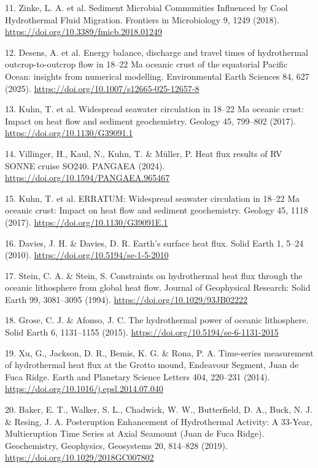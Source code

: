 \documentclass[11pt,a4paper]{article}
\begin{document}
{\small 11. Zinke, L. A. et al. Sediment Microbial Communities Influenced by Cool Hydrothermal Fluid Migration. Frontiers in Microbiology 9, 1249 (2018). \url{https://doi.org/10.3389/fmicb.2018.01249}\par}
{\small 12. Desens, A. et al. Energy balance, discharge and travel times of hydrothermal outcrop-to-outcrop flow in 18--22 Ma oceanic crust of the equatorial Pacific Ocean: insights from numerical modelling. Environmental Earth Sciences 84, 627 (2025). \url{https://doi.org/10.1007/s12665-025-12657-8}\par}
{\small 13. Kuhn, T. et al. Widespread seawater circulation in 18--22 Ma oceanic crust: Impact on heat flow and sediment geochemistry. Geology 45, 799--802 (2017). \url{https://doi.org/10.1130/G39091.1}\par}
{\small 14. Villinger, H., Kaul, N., Kuhn, T. \& Müller, P. Heat flux results of RV SONNE cruise SO240. PANGAEA (2024). \url{https://doi.org/10.1594/PANGAEA.965467}\par}
{\small 15. Kuhn, T. et al. ERRATUM: Widespread seawater circulation in 18--22 Ma oceanic crust: Impact on heat flow and sediment geochemistry. Geology 45, 1118 (2017). \url{https://doi.org/10.1130/G39091E.1}\par}
{\small 16. Davies, J. H. \& Davies, D. R. Earth's surface heat flux. Solid Earth 1, 5--24 (2010). \url{https://doi.org/10.5194/se-1-5-2010}\par}
{\small 17. Stein, C. A. \& Stein, S. Constraints on hydrothermal heat flux through the oceanic lithosphere from global heat flow. Journal of Geophysical Research: Solid Earth 99, 3081--3095 (1994). \url{https://doi.org/10.1029/93JB02222}\par}
{\small 18. Grose, C. J. \& Afonso, J. C. The hydrothermal power of oceanic lithosphere. Solid Earth 6, 1131--1155 (2015). \url{https://doi.org/10.5194/se-6-1131-2015}\par}
{\small 19. Xu, G., Jackson, D. R., Bemis, K. G. \& Rona, P. A. Time-series measurement of hydrothermal heat flux at the Grotto mound, Endeavour Segment, Juan de Fuca Ridge. Earth and Planetary Science Letters 404, 220--231 (2014). \url{https://doi.org/10.1016/j.epsl.2014.07.040}\par}
{\small 20. Baker, E. T., Walker, S. L., Chadwick, W. W., Butterfield, D. A., Buck, N. J. \& Resing, J. A. Posteruption Enhancement of Hydrothermal Activity: A 33-Year, Multieruption Time Series at Axial Seamount (Juan de Fuca Ridge). Geochemistry, Geophysics, Geosystems 20, 814--828 (2019). \url{https://doi.org/10.1029/2018GC007802}\par}
\end{document}
